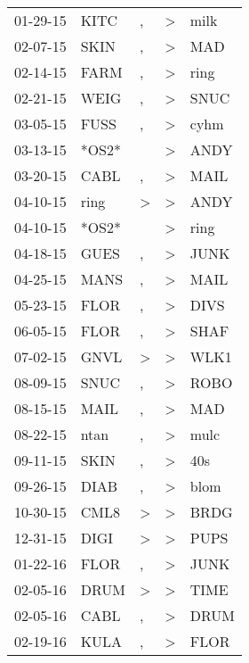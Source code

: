 \begin{supertabular}{lllll}
 01-29-15 &   KITC &             , &     \textgreater &   milk \\
 02-07-15 &   SKIN &             , &     \textgreater &    MAD \\
 02-14-15 &   FARM &             , &     \textgreater &   ring \\
 02-21-15 &   WEIG &             , &     \textgreater &   SNUC \\
 03-05-15 &   FUSS &             , &     \textgreater &   cyhm \\
 03-13-15 &  *OS2* &               &     \textgreater &   ANDY \\
 03-20-15 &   CABL &             , &     \textgreater &   MAIL \\
 04-10-15 &   ring &  \textgreater &     \textgreater &   ANDY \\
 04-10-15 &  *OS2* &               &     \textgreater &   ring \\
 04-18-15 &   GUES &             , &     \textgreater &   JUNK \\
 04-25-15 &   MANS &             , &     \textgreater &   MAIL \\
 05-23-15 &   FLOR &             , &     \textgreater &   DIVS \\
 06-05-15 &   FLOR &             , &     \textgreater &   SHAF \\
 07-02-15 &   GNVL &  \textgreater &     \textgreater &   WLK1 \\
 08-09-15 &   SNUC &             , &     \textgreater &   ROBO \\
 08-15-15 &   MAIL &             , &     \textgreater &    MAD \\
 08-22-15 &   ntan &             , &     \textgreater &   mulc \\
 09-11-15 &   SKIN &             , &     \textgreater &    40s \\
 09-26-15 &   DIAB &             , &     \textgreater &   blom \\
 10-30-15 &   CML8 &  \textgreater &     \textgreater &   BRDG \\
 12-31-15 &   DIGI &  \textgreater &     \textgreater &   PUPS \\
 01-22-16 &   FLOR &             , &     \textgreater &   JUNK \\
 02-05-16 &   DRUM &  \textgreater &     \textgreater &   TIME \\
 02-05-16 &   CABL &             , &     \textgreater &   DRUM \\
 02-19-16 &   KULA &             , &     \textgreater &   FLOR \\

\end{supertabular}

